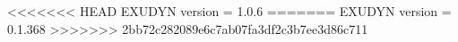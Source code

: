<<<<<<< HEAD
EXUDYN version = 1.0.6
=======
EXUDYN version = 0.1.368
>>>>>>> 2bb72c282089e6c7ab07fa3df2c3b7ee3d86c711
